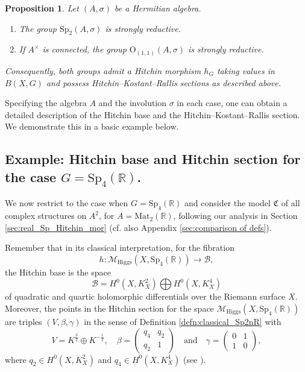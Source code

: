 \documentclass[oneside,11pt]{amsart}
\newtheorem{prop}[thm]{Proposition}
\theoremstyle{definition}
\theoremstyle{remark}
\numberwithin{thm}{section}
\numberwithin{equation}{section}
\begin{document}
\begin{prop}
Let $(A, \sigma)$ be a Hermitian algebra. 
\begin{enumerate}
    \item The group $\mathrm{Sp}_2(A, \sigma)$ is strongly reductive. 
    \item If $A^{\times}$ is connected, the group $\mathrm{O}_{(1,1)}(A, \sigma)$ is strongly reductive.
\end{enumerate}
Consequently, both groups admit a Hitchin morphism $h_G$ taking values in $B(X,G)$ and possess Hitchin--Kostant--Rallis sections as described above.
\end{prop}

Specifying the algebra $A$ and the involution $\sigma$ in each case, one can obtain a detailed description of the Hitchin base and the Hitchin--Kostant--Rallis section. We demonstrate this in a basic example below.

\subsection{Example: Hitchin base and Hitchin section for the case \texorpdfstring{$G=\mathrm{Sp}_{4}(\mathbb{R})$}{}.}
We now restrict to the case when $G=\mathrm{Sp}_{4}(\mathbb{R})$ and consider the model $\mathfrak{C}$ of all complex structures on $A^2$, for $A=\mathrm{Mat}_2(\mathbb{R})$, following our analysis in Section \ref{sec:real_Sp_Hitchin_mor} (cf. also Appendix \ref{sec:comparison of defs}).

Remember that in its classical interpretation, for the fibration 
$$h\colon \mathcal{M}_{\mathrm{Higgs}}(X,\mathrm{Sp}_4(\mathbb{R})) \to \mathcal{B},$$ the Hitchin base is the space 
\[\mathcal{B}= H^0(X, K_X^2)\bigoplus H^0(X, K_X^4)\] 
of quadratic and quartic holomorphic differentials over the Riemann surface $X$. Moreover, the points in the Hitchin section for the space $\mathcal{M}_{\mathrm{Higgs}}(X,\mathrm{Sp}_4(\mathbb{R}))$ are triples $(V, \beta, \gamma)$ in the sense of Definition \ref{defn:classical_Sp2nR} with 
\begin{equation}\label{eqn:Higgs_fields_Teichmuller}
V= K^{\frac{3}{2}} \oplus K^{-\frac{1}{2}}, \quad \beta = \begin{pmatrix} q_4 & q_2 \\ q_2& 1 \end{pmatrix} \quad \text{and} \quad \gamma = \begin{pmatrix} 0 & 1 \\ 1& 0 \end{pmatrix},
\end{equation}
where $q_2 \in H^0(X, K_X^2)$ and $q_4 \in H^0(X, K_X^4)$ (see \cite[Table 1]{BGG12}). 
\end{document}
